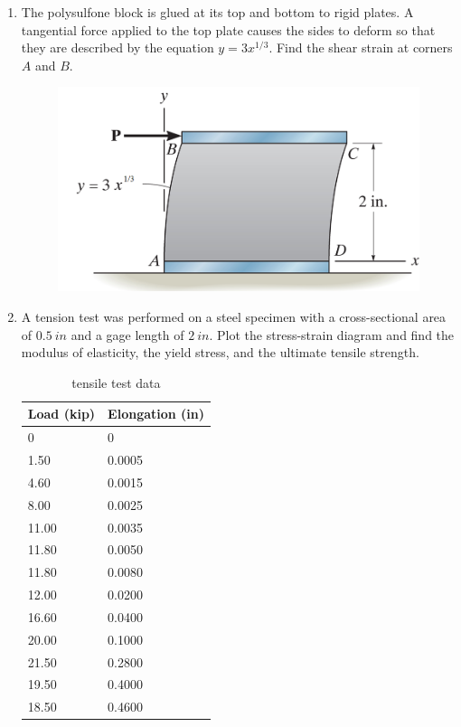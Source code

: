 \documentclass[12pt, oneside]{article}
\let\US\SI
\begin{document}
\begin{enumerate}
	\item %
		The polysulfone block is glued at its top and bottom to rigid plates.
		A tangential force applied to the top plate causes the sides to deform so that they are described by the equation $y=3x^{1/3}$.
		Find the shear strain at corners $A$ and $B$.
		\begin{figure}[H]
			\centering
			\includegraphics[width=0.5\linewidth]{shear2}
			\label{fig:shear2}
		\end{figure}
		\newpage

	\item %
		A tension test was performed on a steel specimen with a cross-sectional area of $\US{0.5}{in}$ and a gage length of $\US{2}{in}$.
		Plot the stress-strain diagram and find the modulus of elasticity, the yield stress, and the ultimate tensile strength.
		\begin{table}[H]
			\centering
			\caption{tensile test data}
			\label{tab:label}
			\begin{tabular}{l|l}
				\textbf{Load (kip)} & \textbf{Elongation (in)}\\
				\midrule
				0 & 0\\
				1.50 & 0.0005\\
				4.60 & 0.0015\\ 
				8.00 & 0.0025\\ 
				11.00 & 0.0035\\ 
				11.80 & 0.0050\\ 
				11.80 & 0.0080\\ 
				12.00 & 0.0200\\ 
				16.60 & 0.0400\\
				20.00 & 0.1000\\ 
				21.50 & 0.2800\\ 
				19.50 & 0.4000\\ 
				18.50 & 0.4600\\ 
			\end{tabular}
		\end{table}


\end{enumerate}
\end{document}
